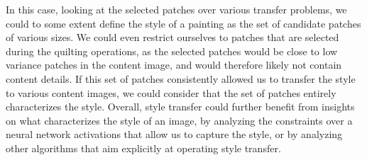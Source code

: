 \documentclass[a4paper]{article}
\begin{document}
In this case, looking at the selected patches over various transfer problems, we could to some extent define the style of a painting as the set of candidate patches of various sizes. We could even restrict ourselves to patches that are selected during the quilting operations, as the selected patches would be close to low variance patches in the content image, and would therefore likely not contain content details. If this set of patches consistently allowed us to transfer the style to various content images, we could consider that the set of patches entirely characterizes the style.
Overall, style transfer could further benefit from insights on what characterizes the style of an image, by analyzing the constraints over a neural network activations that allow us to capture the style, or by analyzing other algorithms that aim explicitly at operating style transfer.    






\end{document}
